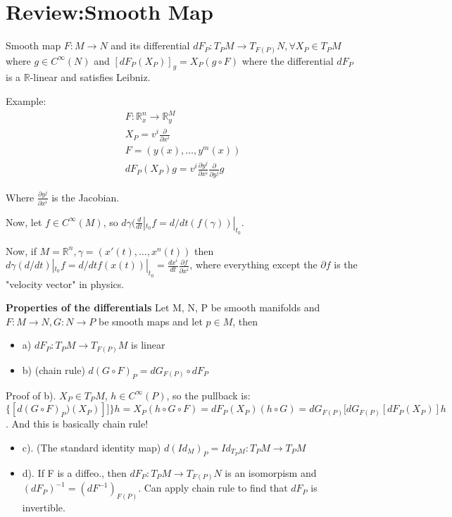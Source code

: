 \documentclass[12pt,letterpaper]{article}
\begin{document}
\section{Review:Smooth Map}
Smooth map $F: M \rightarrow N$ and its differential $dF_P : T_P M \rightarrow T_{F(P)}N, \forall X_P \in T_PM$ where $g \in C^{\infty}(N)$ and $[dF_P (X_P)]_g = X_P (g\circ F)$  where the differential $dF_P$ is a $\mathbb{R}$-linear and satisfies Leibniz.

Example: 
\begin{align*}
    F: \mathbb{R}^n_x \rightarrow \mathbb{R}^M_y \\
    X_P = v^i \frac{\partial }{\partial x^i} \\
    F = (y(x), \dots , y^m(x)) \\
    dF_P(X_P) g = v^i \frac{\partial y ^ j}{\partial x ^ i}\frac{\partial }{\partial y^j} g
\end{align*}

Where $\frac{\partial y^j}{\partial x^i}$ is the Jacobian. 

Now, let $f \in C^{\infty}(M)$, so $d\gamma (\frac{d}{dt}|_{t_0}f = d/dt(f(\gamma))|_{t_0}$. 

Now, if $M = \mathbb{R}^n, \gamma = (x'(t), \dots, x^n(t))$ then $d\gamma (d/dt)|_{t_0}f = d/dt f(x(t))|_{t_0} = \frac{dx^i}{dt}\frac{\partial f}{\partial x^i}$, where everything except the $\partial f$ is the "velocity vector" in physics.

\textbf{Properties of the differentials} Let M, N, P be smooth manifolds and $F: M \rightarrow N, G: N \rightarrow P$ be smooth maps and let $p \in M$, then 
\begin{itemize}
    \item a) $ dF_P: T_P M \rightarrow T_{F(P)}M$ is linear
    \item b) (chain rule) $d(G \circ F)_P = dG_{F(P)} \circ dF_P$
\end{itemize}

Proof of b). $X_P \in T_P M$, $h\in C^{\infty}(P)$, so the pullback is: $\{[ d(G \circ F)_P)(X_P)]]\} h = X_P (h \circ G \circ F) = dF_P(X_P)(h \circ G) =  dG_{F(P)}[dG_{F(P)}[dF_P(X_P)]h$. And this is basically chain rule!

\begin{itemize}
    \item c). (The standard identity map) $d(Id_M)_P = Id_{T_PM}: T_PM \rightarrow T_PM$
    \item d). If F is a diffeo., then $dF_P: T_PM \rightarrow T_{F(P)}N$ is an isomorpism and $(dF_P)^{-1} = (dF^{-1})_{F(P)}$. Can apply chain rule to find that $dF_P$ is invertible.
\end{itemize}
\end{document}
